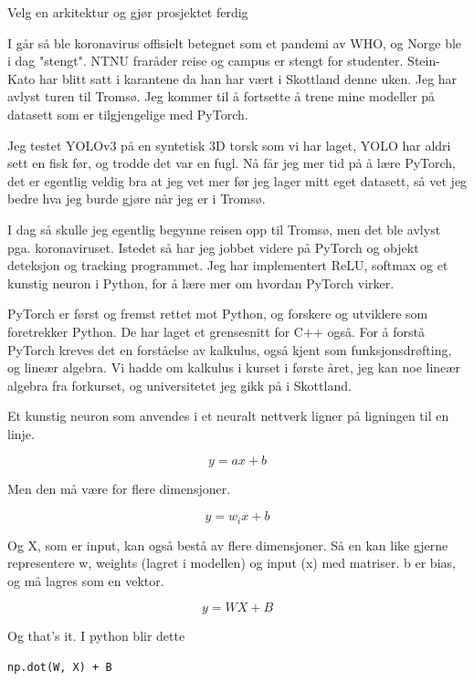 Velg en arkitektur og gjør prosjektet ferdig

I går så ble koronavirus offisielt betegnet som et pandemi av WHO, og Norge ble i dag "stengt". NTNU fraråder reise og campus er stengt for studenter. Stein-Kato har blitt satt i karantene da han har vært i Skottland denne uken. Jeg har avlyst turen til Tromsø. Jeg kommer til å fortsette å trene mine modeller på datasett som er tilgjengelige med PyTorch.

Jeg testet YOLOv3 på en syntetisk 3D torsk som vi har laget, YOLO har aldri sett en fisk før, og trodde det var en fugl. Nå får jeg mer tid på å lære PyTorch, det er egentlig veldig bra at jeg vet mer før jeg lager mitt eget datasett, så vet jeg bedre hva jeg burde gjøre når jeg er i Tromsø.

I dag så skulle jeg egentlig begynne reisen opp til Tromsø, men det ble avlyst pga. koronaviruset. Istedet så har jeg jobbet videre på PyTorch og objekt deteksjon og tracking programmet. Jeg har implementert ReLU, softmax og et kunstig neuron i Python, for å lære mer om hvordan PyTorch virker.

PyTorch er først og fremst rettet mot Python, og forskere og utviklere som foretrekker Python. De har laget et grensesnitt for C++ også. For å forstå PyTorch kreves det en forståelse av kalkulus, også kjent som funksjonsdrøfting, og lineær algebra. Vi hadde om kalkulus i kurset i første året, jeg kan noe lineær algebra fra forkurset, og universitetet jeg gikk på i Skottland.

Et kunstig neuron som anvendes i et neuralt nettverk ligner på ligningen til en linje.

\begin{equation}
y = ax + b
\end{equation}

Men den må være for flere dimensjoner.

\begin{equation}
y = w_i x + b
\end{equation}

Og X, som er input, kan også bestå av flere dimensjoner. Så en kan like gjerne representere w, weights (lagret i modellen) og input (x) med matriser. b er bias, og må lagres som en vektor.

\begin{equation}
y = WX + B
\end{equation}

Og that's it. I python blir dette

\begin{verbatim}
np.dot(W, X) + B
\end{verbatim}

